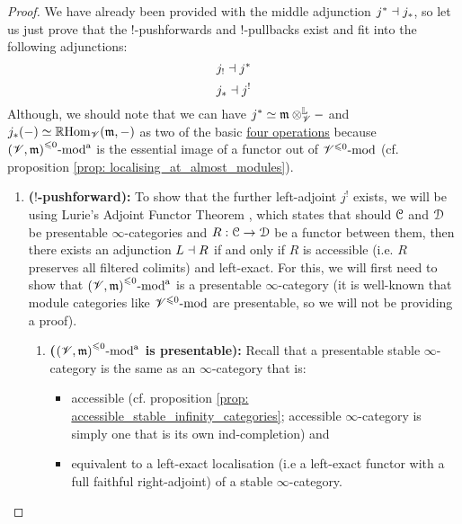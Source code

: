                         \begin{proof}
                            We have already been provided with the middle adjunction $j^* \dashv j_*$, so let us just prove that the $!$-pushforwards and $!$-pullbacks exist and fit into the following adjunctions:
                                $$j_! \dashv j^*$$
                                $$j_* \dashv j^!$$
                            Although, we should note that we can have $j^* \cong \m \tensor_{\scrV}^{\L} -$ and $j_*(-) \simeq \mathbb{R}\mathrm{Hom}_{\mathscr{V}}(\mathfrak{m}, -)$ as two of the basic \href{https://ncatlab.org/nlab/show/six+operations}{\underline{four operations}} because ${(\mathscr{V}, \mathfrak{m})}^{\leqslant 0}\text{-}\mathrm{mod}^{\mathrm{a}}$ is the essential image of a functor out of ${\mathscr{V}}^{\leqslant 0}\text{-}\mathrm{mod}$ (cf. proposition \ref{prop: localising_at_almost_modules}). 
                                \begin{enumerate}
                                    \item \textbf{($!$-pushforward):} To show that the further left-adjoint $j^!$ exists, we will be using Lurie's Adjoint Functor Theorem \cite[Corollary 5.5.2.9]{HTT}, which states that should $\mathcal{C}$ and $\mathcal{D}$ be presentable $\infty$-categories and $R: \mathcal{C} \to \mathcal{D}$ be a functor between them, then there exists an adjunction $L \dashv R$ if and only if $R$ is accessible (i.e. $R$ preserves all filtered colimits) and left-exact. For this, we will first need to show that ${(\mathscr{V}, \mathfrak{m})}^{\leqslant 0}\text{-}\mathrm{mod}^{\mathrm{a}}$ is a presentable $\infty$-category (it is well-known that module categories like ${\mathscr{V}}^{\leqslant 0}\text{-}\mathrm{mod}$ are presentable, so we will not be providing a proof).
                                        \begin{enumerate}
                                            \item \textbf{(${(\mathscr{V}, \mathfrak{m})}^{\leqslant 0}\text{-}\mathrm{mod}^{\mathrm{a}}$ is presentable):} Recall that a presentable stable $\infty$-category is the same as an $\infty$-category that is:
                                                \begin{itemize}
                                                    \item accessible (cf. proposition \ref{prop: accessible_stable_infinity_categories}; accessible $\infty$-category is simply one that is its own ind-completion) and
                                                    \item equivalent to a left-exact localisation (i.e a left-exact functor with a full faithful right-adjoint) of a stable $\infty$-category.
                                                \end{itemize}  
                                                

\end{enumerate}
\end{enumerate}
\end{proof}
